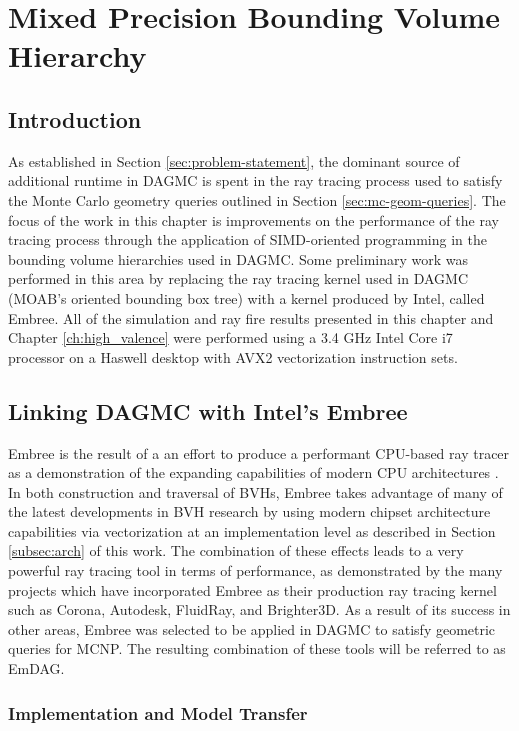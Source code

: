 
\chapter{Mixed Precision Bounding Volume Hierarchy}\label{ch:simd_bvh}

\section{Introduction}

As established in Section \ref{sec:problem-statement}, the dominant source of
additional runtime in DAGMC is spent in the ray tracing process used to satisfy
the Monte Carlo geometry queries outlined in Section \ref{sec:mc-geom-queries}.
The focus of the work in this chapter is improvements on the performance of the
ray tracing process through the application of SIMD-oriented programming in the
bounding volume hierarchies used in DAGMC. Some preliminary work was performed
in this area by replacing the ray tracing kernel used in DAGMC (MOAB's oriented
bounding box tree) with a kernel produced by Intel, called Embree. All of the
simulation and ray fire results presented in this chapter and Chapter
\ref{ch:high_valence} were performed using a 3.4 GHz Intel Core i7 processor on
a Haswell desktop with AVX2 vectorization instruction sets.

\section{Linking DAGMC with Intel's Embree}\label{sec:embree}

Embree is the result of a an effort to produce a performant CPU-based ray tracer
as a demonstration of the expanding capabilities of modern CPU architectures
\cite{Wald_2014}. In both construction and traversal of BVHs, Embree takes
advantage of many of the latest developments in BVH research by using modern
chipset architecture capabilities via vectorization at an implementation level
as described in Section \ref{subsec:arch} of this work. The combination of these
effects leads to a very powerful ray tracing tool in terms of performance, as
demonstrated by the many projects which have incorporated Embree as their
production ray tracing kernel such as Corona, Autodesk, FluidRay, and
Brighter3D. As a result of its success in other areas, Embree was selected to be
applied in DAGMC to satisfy geometric queries for MCNP. The resulting
combination of these tools will be referred to as EmDAG.

\subsection{Implementation and Model Transfer}\label{sec:emdag_transfer}

